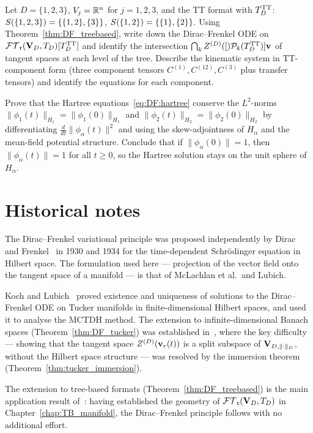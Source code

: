 \begin{exercise}[Dirac--Frenkel for the tensor train, $d=3$]
Let $D = \{1,2,3\}$, $V_j = \mathbb{R}^n$ for $j=1,2,3$, and the TT format
with $T_D^{\mathrm{TT}}$: $S(\{1,2,3\}) = \{\{1,2\},\{3\}\}$,
$S(\{1,2\}) = \{\{1\},\{2\}\}$. Using
Theorem~\ref{thm:DF_treebased}, write down the Dirac--Frenkel ODE
on $\mathcal{FT}_{\mathfrak{r}}(\mathbf{V}_D,T_D)[T_D^{\mathrm{TT}}]$ and identify the intersection
$\bigcap_k Z^{(D)}([)\mathcal{P}_{k}(T_D^{\mathrm{TT}})]{\mathbf{v}}$ of tangent spaces at each level
of the tree. Describe the kinematic system in TT-component form
(three component tensors $C^{(1)}, C^{(12)}, C^{(3)}$ plus transfer
tensors) and identify the equations for each component.
\end{exercise}

\begin{exercise}
Prove that the Hartree equations~\eqref{eq:DF:hartree} conserve the
$L^2$-norms $\|\phi_1(t)\|_{H_1} = \|\phi_1(0)\|_{H_1}$ and
$\|\phi_2(t)\|_{H_2} = \|\phi_2(0)\|_{H_2}$ by differentiating
$\frac{d}{dt}\|\phi_\alpha(t)\|^2$ and using the skew-adjointness of
$H_\alpha$ and the mean-field potential structure. Conclude that
if $\|\phi_\alpha(0)\| = 1$, then $\|\phi_\alpha(t)\| = 1$ for all
$t \geq 0$, so the Hartree solution stays on the unit sphere of $H_\alpha$.
\end{exercise}

\section{Historical notes}
\label{sec:DF:history}

The Dirac--Frenkel variational principle was proposed independently by
Dirac~\cite{Dirac1930} and Frenkel~\cite{Frenkel1934} in 1930 and 1934
for the time-dependent Schrödinger equation in Hilbert space. The
formulation used here — projection of the vector field onto the tangent
space of a manifold — is that of McLachlan et al.\ and Lubich.

Koch and Lubich~\cite{KochLubich2007} proved existence and uniqueness
of solutions to the Dirac--Frenkel ODE on Tucker manifolds in
finite-dimensional Hilbert spaces, and used it to analyse the MCTDH
method. The extension to infinite-dimensional Banach spaces
(Theorem~\ref{thm:DF_tucker}) was established in~\cite{FHN2019},
where the key difficulty — showing that the tangent space $Z^{(D)}(\mathbf{v}_r(t))$
is a split subspace of $\mathbf{V}_{D,\|\cdot\|_D}$, without the Hilbert space structure —
was resolved by the immersion theorem (Theorem~\ref{thm:tucker_immersion}).

The extension to tree-based formats (Theorem~\ref{thm:DF_treebased})
is the main application result of~\cite{FHN2023}: having established
the geometry of $\mathcal{FT}_{\mathfrak{r}}(\mathbf{V}_D,T_D)$ in Chapter~\ref{chap:TB_manifold}, the
Dirac--Frenkel principle follows with no additional effort.

